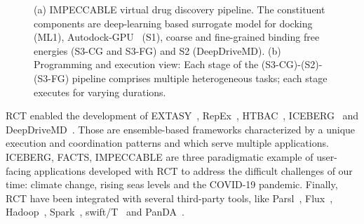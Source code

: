 \documentclass[preprint,12pt, a4paper]{elsarticle}
\begin{document}
\begin{figure}[h]
        \centering
        \qquad
        \caption{(a) IMPECCABLE virtual drug discovery pipeline. The constituent
        components are deep-learning based surrogate model for docking (ML1),
        Autodock-GPU~\cite{legrand2020gpu} (S1), coarse and fine-grained binding
        free energies (S3-CG and S3-FG) and S2 (DeepDriveMD). (b) Programming
        and execution view: Each stage of the (S3-CG)-(S2)-(S3-FG) pipeline
        comprises multiple heterogeneous tasks; each stage executes for varying
        durations.}\label{fig:impeccable}
\end{figure}

RCT enabled the development of EXTASY~\cite{balasubramanian2016extasy},
RepEx~\cite{treikalis2016repex}, HTBAC~\cite{dakka2018high},
ICEBERG~\cite{paraskevakos2019workflow} and
DeepDriveMD~\cite{lee2019deepdrivemd}. Those are ensemble-based frameworks
characterized by a unique execution and coordination patterns and which serve
multiple applications. ICEBERG, FACTS, IMPECCABLE are three paradigmatic example
of user-facing applications developed with RCT to address the difficult
challenges of our time: climate change, rising seas levels and the COVID-19
pandemic. Finally, RCT have been integrated with several third-party tools, like
Parsl~\cite{alsaadi2022radical}, Flux~\cite{rp-gh-flux},
Hadoop~\cite{luckow2016hadoop}, Spark~\cite{paraskevakos2018task},
swift/T~\cite{turilli2016integrating} and PanDA~\cite{merzky2019panda}.
\end{document}
